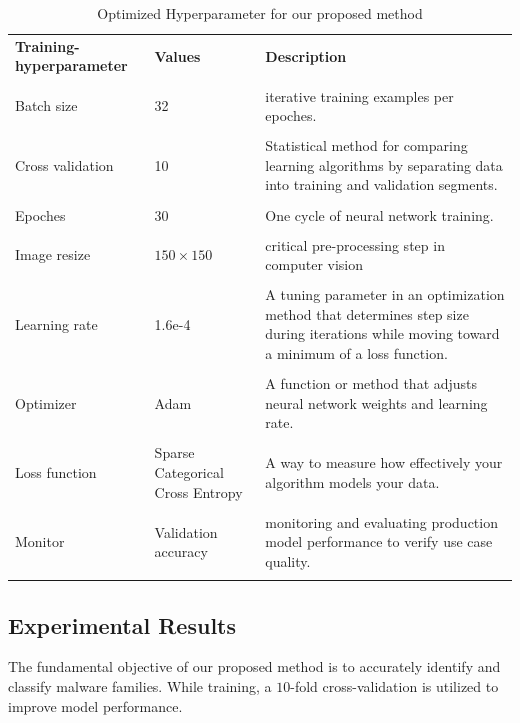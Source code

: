\documentclass[pdflatex,sn-mathphys]{sn-jnl}%
\begin{document}
	\begin{table}[tb]
         \centering
		 \caption{Optimized Hyperparameter for our proposed method}
		 \begin{tabular}{|p{2.6cm}||p{1.5cm}||p{4cm}|}
			\midrule
			\textbf{Training-hyperparameter} & \textbf{Values} & \textbf{Description} \\\\
			  \midrule
			Batch size  &  32 & iterative training examples per epoches.  \\\\
		
			Cross validation & 10 & Statistical method for comparing learning algorithms by separating data into training and validation segments. \\\\
			
			Epoches &  30 & One cycle of neural network training. \\\\
	
			Image resize &  \({150} \times {150}\) & critical pre-processing step in computer vision \\\\

            Learning rate  & 1.6e-4 & A tuning parameter in an optimization method that determines step size during iterations while moving toward a minimum of a loss function. \\\\

            Optimizer & Adam & A function or method that adjusts neural network weights and learning rate. \\\\

            Loss function  & Sparse Categorical Cross Entropy & A way to measure how effectively your algorithm models your data. \\\\

            Monitor & Validation accuracy & monitoring and evaluating production model performance to verify use case quality. \\\\
			\hline
		\end{tabular}
	
		\label{hyperpara}
  \vspace{-4mm}
	\end{table}
\subsection{Experimental Results}
\label{result}
The fundamental objective of our proposed method is to accurately identify and classify malware families. While training, a $10$-fold cross-validation is utilized to improve model performance.
\end{document}

